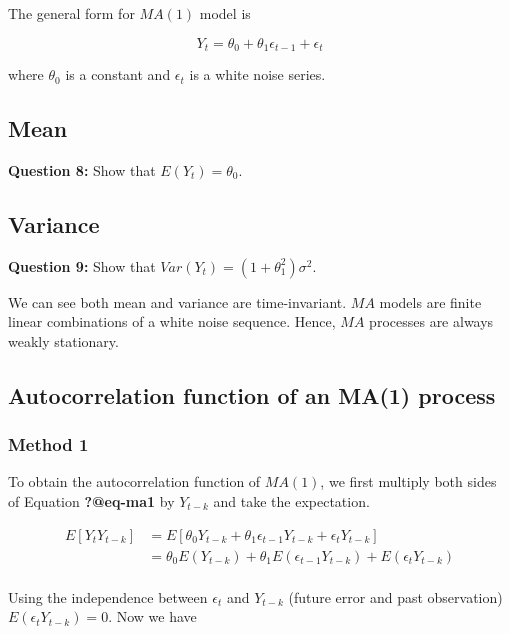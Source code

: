 \documentclass[
  11pt,
  a4paper,
]{report}
\begin{document}
The general form for \(MA(1)\) model is

\begin{equation}
Y_t = \theta_0 + \theta_1 \epsilon_{t-1} + \epsilon_t
\end{equation}

where \(\theta_0\) is a constant and \({\epsilon_t}\) is a white noise
series.

\subsection{Mean}\label{mean-3}

\textbf{Question 8:} Show that \(E(Y_t) = \theta_0\).

\subsection{Variance}\label{variance-2}

\textbf{Question 9:} Show that \(Var(Y_t) = (1+\theta_1^2)\sigma^2\).

We can see both mean and variance are time-invariant. \(MA\) models are
finite linear combinations of a white noise sequence. Hence, \(MA\)
processes are always weakly stationary.

\subsection{Autocorrelation function of an MA(1)
process}\label{autocorrelation-function-of-an-ma1-process}

\subsubsection{Method 1}\label{method-1}

To obtain the autocorrelation function of \(MA(1)\), we first multiply
both sides of Equation \textbf{?@eq-ma1} by \(Y_{t-k}\) and take the
expectation.

\begin{equation}
\begin{aligned}
E[Y_tY_{t-k}] &= E[\theta_0 Y_{t-k} + \theta_1 \epsilon_{t-1} Y_{t-k} + \epsilon_t Y_{t-k}]\\
&= \theta_0 E(Y_{t-k}) + \theta_1 E(\epsilon_{t-1}Y_{t-k}) + E(\epsilon_t Y_{t-k})\\
\end{aligned}
\end{equation}

Using the independence between \(\epsilon_t\) and \(Y_{t-k}\) (future
error and past observation) \(E(\epsilon_t Y_{t-k}) = 0\). Now we have
\end{document}
